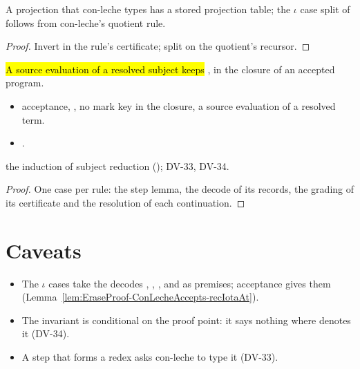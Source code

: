 \begin{lemma}
  \label{lem:EraseProof-findProj_of_typed}
  \leanok
   A projection that con-leche types has a stored projection table; the $\iota$ case split of  follows from con-leche's quotient rule.
\end{lemma}
\begin{proof}
  \leanok
   Invert  in the rule's certificate; split  on the quotient's recursor.
\end{proof}

\begin{lemma}
  \label{lem:EraseProof-semSim_of_srcEval}
  \leanok
   \hl{A source evaluation of a resolved subject keeps }, in the closure of an accepted program.
  \begin{itemize}
  \item {} acceptance, , no mark key in the closure, a source evaluation of a resolved term.
  \item {} .
  \end{itemize}
   the induction of subject reduction (); DV-33, DV-34.
\end{lemma}
\begin{proof}
  \leanok
   One case per rule: the step lemma, the decode of its records, the grading of its certificate and the resolution of each continuation.
\end{proof}

\section*{Caveats}
\begin{itemize}
\item The $\iota$ cases take the decodes , , ,  and  as premises; acceptance gives them (Lemma~\ref{lem:EraseProof-ConLecheAccepts-recIotaAt}).
\item The invariant is conditional on the proof point: it says nothing where  denotes it (DV-34).
\item A step that forms a redex asks con-leche to type it (DV-33).
\end{itemize}
